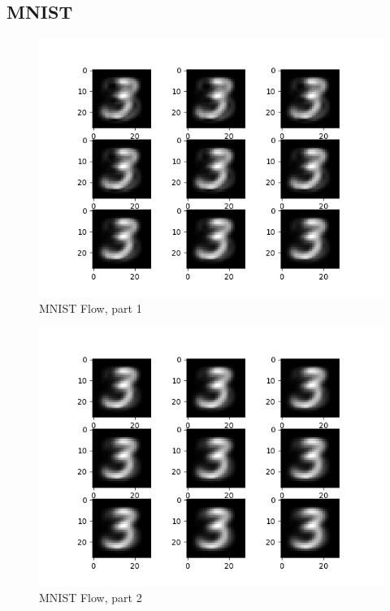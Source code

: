 \documentclass[12pt]{report}
\begin{document}
\subsection{MNIST}

\begin{figure}[h]
    \begin{center}
        \includegraphics[]{mnist1.png}
        \caption{MNIST Flow, part 1}
        \label{fig:pflowtoy}
    \end{center}
\end{figure}



\begin{figure}[h]
    \begin{center}
        \includegraphics[]{mnist2.png}
        \caption{MNIST Flow, part 2}
        \label{fig:pflowtoy}
    \end{center}
\end{figure}
\end{document}

